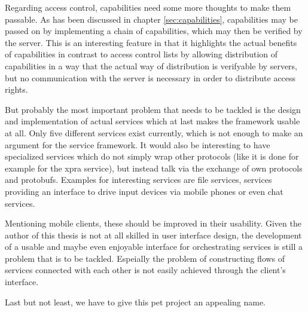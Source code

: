 Regarding access control, capabilities need some more thoughts to make them passable.
As has been discussed in chapter \ref{sec:capabilities}, capabilities may be passed on by implementing a chain of capabilities, which may then be verified by the server.
This is an interesting feature in that it highlights the actual benefits of capabilities in contrast to access control lists by allowing distribution of capabilities in a way that the actual way of distribution is verifyable by servers, but no communication with the server is necessary in order to distribute access rights.

But probably the most important problem that needs to be tackled is the design and implementation of actual services which at last makes the framework usable at all.
Only five different services exist currently, which  is not enough to make an argument for the service framework.
It would also be interesting to have specialized services which do not simply wrap other protocols (like it is done for example for the xpra service), but instead talk via the exchange of own protocols and protobufs.
Examples for interesting services are file services, services providing an interface to drive input devices via mobile phones or even chat services.

Mentioning mobile clients, these should be improved in their usability.
Given the author of this thesis is not at all skilled in user interface design, the development of a usable and maybe even enjoyable interface for orchestrating services is still a problem that is to be tackled.
Espeially the problem of constructing flows of services connected with each other is not easily achieved through the client's interface.

Last but not least, we have to give this pet project an appealing name.

